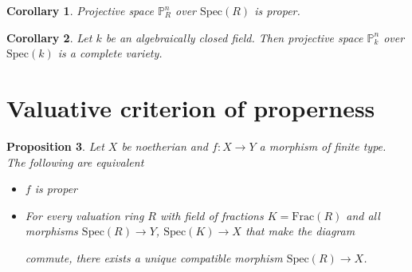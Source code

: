 \documentclass{scrartcl}
\renewcommand{\P}{\mathbb{P}}
\newcommand{\Spec}{\mathrm{Spec}}
\newcommand{\Frac}{\mathrm{Frac}}
\newtheorem{prop}{Proposition}
\newtheorem{corollary}[prop]{Corollary}
\theoremstyle{definition}
\begin{document}
\begin{corollary}
    Projective space $\P_R^n$ over $\Spec(R)$ is proper.
\end{corollary}
\begin{corollary}
    Let $k$ be an algebraically closed field.
    Then projective space $\P_k^n$ over $\Spec(k)$ is a complete variety.
\end{corollary}

\section{Valuative criterion of properness}
\begin{prop}
    Let $X$ be noetherian and $f: X \to Y$ a morphism of finite type.
    The following are equivalent
    \begin{itemize}
        \item $f$ is proper
        \item For every valuation ring $R$ with field of fractions $K = \Frac(R)$ and all morphisms $\Spec(R) \to Y$, $\Spec(K) \to X$ that make the diagram
        \begin{center}
        \end{center}
        commute, there exists a unique compatible morphism $\Spec(R) \to X$.
    \end{itemize}
\end{prop}
\printbibliography
\end{document}
